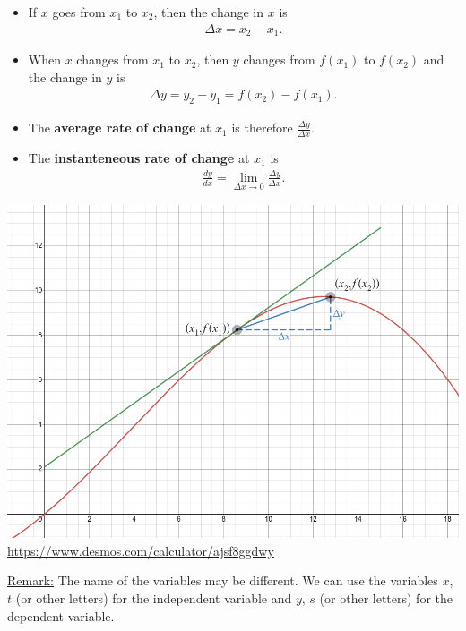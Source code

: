 \documentclass[12pt,a4paper]{article}
\newcommand{\ra}{\rightarrow}
\begin{document}
\begin{multicols}{2}
\begin{itemize}
\item If $x$ goes from $x_1$ to $x_2$, then the change in $x$ is
	\begin{align*}
	\Delta x = x_2 - x_1 .
	\end{align*}
\item When $x$ changes from $x_1$ to $x_2$, then $y$ changes from $f(x_1)$ to $f(x_2)$ and the change in $y$ is
	\begin{align*}
	\Delta y = y_2 - y_1 = f(x_2) - f(x_1) .
	\end{align*}
\item The \textbf{average rate of change} at $x_1$ is therefore $\displaystyle \frac{\Delta y}{\Delta x}$.
\item The \textbf{instanteneous rate of change} at $x_1$ is
	\begin{align*}
	\frac{dy}{dx} = \lim_{\Delta x \ra 0} \frac{\Delta y}{\Delta x} .
	\end{align*}
\end{itemize}

\begin{center}
\includegraphics[scale=0.25]{section2-7_fig_1.png}
\url{https://www.desmos.com/calculator/ajsf8ggdwy}
\end{center}
\end{multicols}

\underline{Remark:} The name of the variables may be different. We can use the variables $x$, $t$ (or other letters) for the independent variable and $y$, $s$ (or other letters) for the dependent variable.
\end{document}
